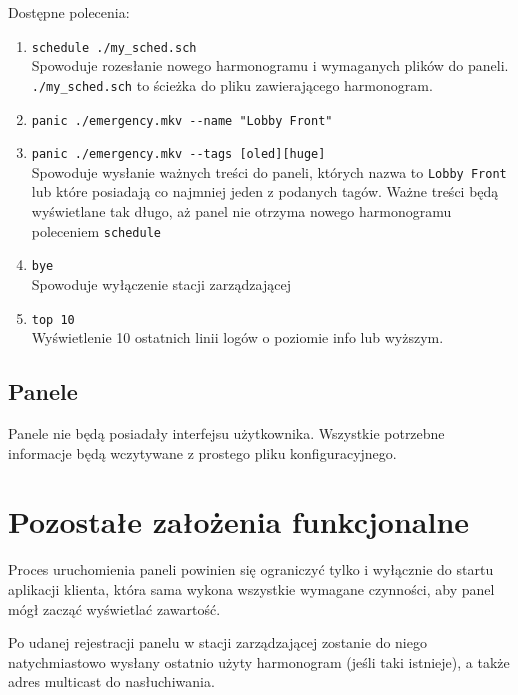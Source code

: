 \documentclass[12pt, a4paper]{article}
\providecommand{\tightlist}{%
  \setlength{\itemsep}{0pt}\setlength{\parskip}{0pt}}
\begin{document}
Dostępne polecenia: 

\begin{enumerate}
\def\labelenumi{\arabic{enumi}.}
\tightlist
\item \texttt{schedule\ ./my\_sched.sch} \\
Spowoduje rozesłanie nowego harmonogramu i wymaganych plików do paneli.\\ \texttt{./my\_sched.sch} to ścieżka do pliku zawierającego harmonogram.
\item \texttt{panic\ ./emergency.mkv\ -\/-name\ "Lobby\ Front"}
\item \texttt{panic\ ./emergency.mkv\ -\/-tags\ {[}oled{]}{[}huge{]}}\\
Spowoduje wysłanie ważnych treści do paneli, których nazwa to
\texttt{Lobby\ Front} lub które posiadają co najmniej jeden z podanych
tagów. Ważne treści będą wyświetlane tak długo, aż panel nie otrzyma
nowego harmonogramu poleceniem \texttt{schedule}
\item \texttt{bye} \\
Spowoduje wyłączenie stacji zarządzającej
\item \texttt{top\ 10} \\
Wyświetlenie 10 ostatnich linii logów o poziomie info lub wyższym.
\end{enumerate}

\hypertarget{panele}{%
\subsection{Panele}\label{panele}}

Panele nie będą posiadały interfejsu użytkownika. Wszystkie potrzebne
informacje będą wczytywane z prostego pliku konfiguracyjnego.

\hypertarget{pozostaux142e-zaux142oux17cenia-funkcjonalne}{%
\section{Pozostałe założenia funkcjonalne}\label{pozostaux142e-zaux142oux17cenia-funkcjonalne}}

Proces uruchomienia paneli powinien się ograniczyć tylko i wyłącznie do
startu aplikacji klienta, która sama wykona wszystkie wymagane
czynności, aby panel mógł zacząć wyświetlać zawartość.

Po udanej rejestracji panelu w stacji zarządzającej zostanie do niego
natychmiastowo wysłany ostatnio użyty harmonogram (jeśli taki istnieje), a także adres multicast do nasłuchiwania.
\end{document}
